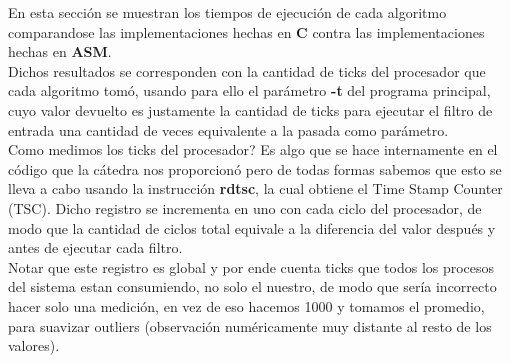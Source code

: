 \indent En esta secci\'on se muestran los tiempos de ejecuci\'on de cada algoritmo comparandose las implementaciones hechas en \textbf{C} contra las implementaciones hechas en \textbf{ASM}.\\
Dichos resultados se corresponden con la cantidad de ticks del procesador que cada algoritmo tom\'o, usando para ello el par\'ametro \textbf{-t} del programa principal, cuyo valor devuelto es justamente la cantidad de ticks para ejecutar el filtro de entrada una cantidad de veces equivalente a la pasada como par\'ametro.\\
\indent Como medimos los ticks del procesador? Es algo que se hace internamente en el c\'odigo que la c\'atedra nos proporcion\'o pero de todas formas sabemos que esto se lleva a cabo usando la instrucci\'on \textbf{rdtsc}, la cual obtiene el Time Stamp Counter (TSC). Dicho registro se incrementa en uno con cada ciclo del procesador, de modo que la cantidad de ciclos total equivale a la diferencia del valor despu\'es y antes de ejecutar cada filtro.\\
Notar que este registro es global y por ende cuenta ticks que todos los procesos del sistema estan consumiendo, no solo el nuestro, de modo que ser\'ia incorrecto hacer solo una medici\'on, en vez de eso hacemos 1000 y tomamos el promedio, para suavizar outliers (observaci\'on num\'ericamente muy distante al resto de los valores).

